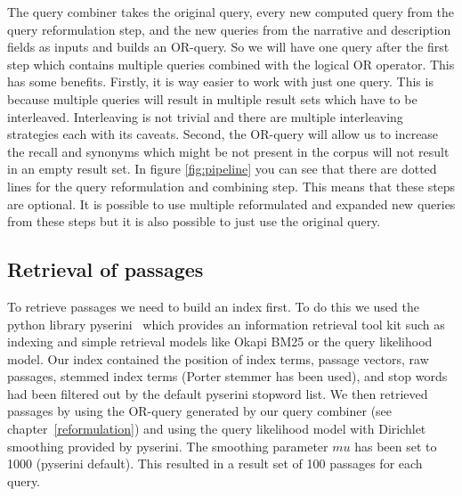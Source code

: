         The query combiner takes the original query, every new computed query from the query reformulation step, and the new queries from the narrative and description fields as inputs and builds an OR-query. So we will have one query after the first step which contains multiple queries combined with the logical OR operator. This has some benefits. Firstly, it is way easier to work with just one query. This is because multiple queries will result in multiple result sets which have to be interleaved. Interleaving is not trivial and there are multiple interleaving strategies each with its caveats. Second, the OR-query will allow us to increase the recall and synonyms which might be not present in the corpus will not result in an empty result set. In figure \ref{fig:pipeline} you can see that there are dotted lines for the query reformulation and combining step. This means that these steps are optional. It is possible to use multiple reformulated and expanded new queries from these steps but it is also possible to just use the original query.
    \subsection{Retrieval of passages} \label{retrieval}
        To retrieve passages we need to build an index first. To do this we used the python library pyserini~\cite{LinMLYPN2021} which provides an information retrieval tool kit such as indexing and simple retrieval models like Okapi BM25 or the query likelihood model. Our index contained the position of index terms, passage vectors, raw passages, stemmed index terms (Porter stemmer has been used), and stop words had been filtered out by the default pyserini stopword list. We then retrieved passages by using the OR-query generated by our query combiner (see chapter~\ref{reformulation}) and using the query likelihood model with Dirichlet smoothing provided by pyserini. The smoothing parameter $mu$ has been set to 1000 (pyserini default). This resulted in a result set of 100 passages for each query.
